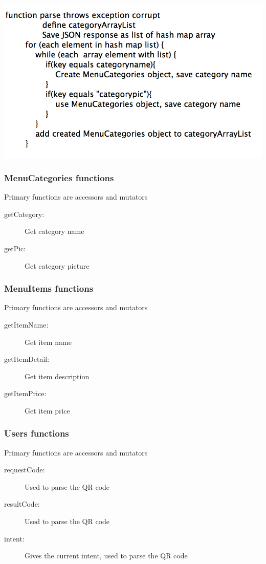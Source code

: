 \documentclass[12pt, titlepage]{article}
\begin{document}
\includegraphics[width=150mm,scale=0.5]{parser.png}


\subsubsection{MenuCategories functions}
Primary functions are accessors and mutators
\begin{description}
  \item[getCategory:] Get category name
  \item[getPic:] Get category picture
\end{description}

\subsubsection{MenuItems functions}
Primary functions are accessors and mutators
\begin{description}
  \item[getItemName:] Get item name
  \item[getItemDetail:] Get item description
  \item[getItemPrice:] Get item price 
\end{description}

\subsubsection{Users functions}
Primary functions are accessors and mutators
\begin{description}
  \item[requestCode:] Used to parse the QR code 
  \item[resultCode:] Used to parse the QR code 
  \item[intent:] Gives the current intent, used to parse the QR code
\end{description}
\end{document}

